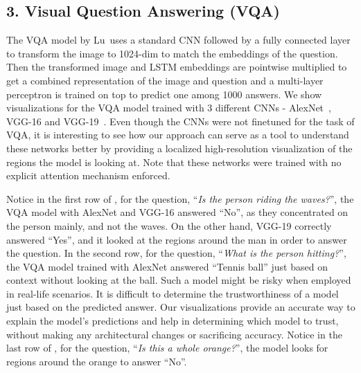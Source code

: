 \subsection*{3. Visual Question Answering (VQA)}


The VQA model by Lu~\etal uses a standard CNN followed by a fully connected layer to transform the image to 1024-dim to match the  embeddings of the question. Then the transformed image and LSTM embeddings are pointwise multiplied to get a combined representation of the image and question and a multi-layer perceptron is trained on top to predict one among 1000 answers.
We show visualizations for the VQA model trained with 3 different CNNs - AlexNet~\cite{krizhevsky_nips12}, VGG-16 and VGG-19~\cite{simonyan_arxiv14}.
Even though the CNNs were not finetuned for the task of VQA, it is interesting to see how our approach can serve as a tool to understand these networks better by providing a localized high-resolution visualization of the regions the model is looking at. Note that these networks were trained with no explicit attention mechanism enforced.

Notice in the first row of , for the question, ``\emph{Is the person riding the waves?}'', the VQA model with AlexNet and VGG-16 answered ``No'', as they concentrated on the person mainly, and not the waves.
On the other hand, VGG-19 correctly answered ``Yes'', and it looked at the regions around the man in order to answer the question.
In the second row, for the question, ``\emph{What is the person hitting?}'', the VQA model trained with AlexNet answered ``Tennis ball'' just based on context without looking at the ball.
Such a model might be risky when employed in real-life scenarios.
It is difficult to determine the trustworthiness of a model just based on the predicted answer.
Our visualizations provide an accurate way to explain the model's predictions and help in determining which model to trust, without making any architectural changes or sacrificing accuracy.
Notice in the last row of , for the question, ``\emph{Is this a whole orange?}'', the model looks for regions around the orange to answer ``No''.

